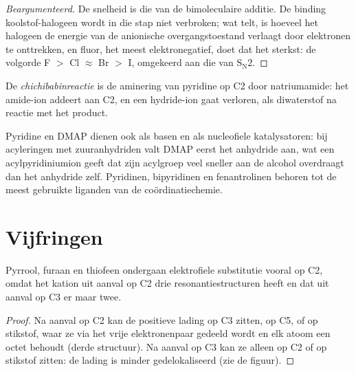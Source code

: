 \begin{proof}[Beargumenteerd]
De snelheid is die van de bimoleculaire additie. De binding
koolstof-halogeen wordt in die stap niet verbroken; wat telt, is hoeveel
het halogeen de energie van de anionische overgangstoestand verlaagt
door elektronen te onttrekken, en fluor, het meest elektronegatief, doet
dat het sterkst: de volgorde F $>$ Cl $\approx$ Br $>$ I, omgekeerd aan die van $\mathrm S_\mathrm N2$.
\end{proof}

\begin{definition}[Chichibabinreactie]\label{def:b3:heterocycles:chichibabin}
De \emph{chichibabinreactie} is de aminering van
pyridine op C2 door natriumamide: het amide-ion addeert aan C2, en een
hydride-ion gaat verloren, als diwaterstof na reactie met het product.
\end{definition}

Pyridine en DMAP dienen ook als basen en als nucleofiele katalysatoren:
bij acyleringen met zuuranhydriden valt DMAP eerst het anhydride aan, wat
een acylpyridiniumion geeft dat zijn acylgroep veel sneller aan de
alcohol overdraagt dan het anhydride zelf. Pyridinen, bipyridinen en
fenantrolinen behoren tot de meest gebruikte liganden van de
coördinatiechemie.

\section{Vijfringen}

\begin{proposition}\label{prop:b3:heterocycles:pyrrole-c2}
Pyrrool, furaan en thiofeen ondergaan elektrofiele substitutie vooral op
C2, omdat het kation uit aanval op C2 drie resonantiestructuren heeft en
dat uit aanval op C3 er maar twee.
\end{proposition}

\begin{proof}
Na aanval op C2 kan de positieve lading op C3 zitten, op C5, of op
stikstof, waar ze via het vrije elektronenpaar gedeeld wordt en elk atoom
een octet behoudt (derde structuur). Na aanval op C3 kan ze alleen op C2
of op stikstof zitten: de lading is minder gedelokaliseerd (zie de
figuur).
\end{proof}

